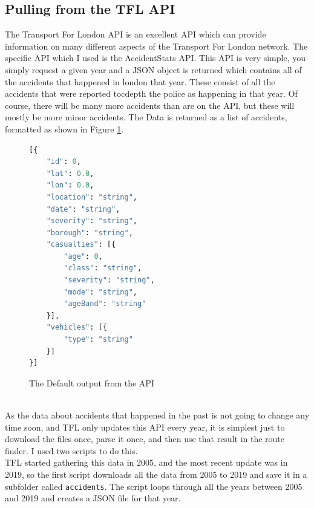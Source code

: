 \documentclass[11pt,twoside,a4paper]{report}
\begin{document}
\subsection{Pulling from the TFL API}
\label{Pulling from the TFL API}
The Transport For London API is an excellent API which can provide information on many different aspects of the Transport For London network. The specific API which I used is the AccidentStats API.
This API is very simple, you simply request a given year and a JSON object is returned which contains all of the accidents that happened in london that year. These consist of all the accidents that were reported tocdepth
the police as happening in that year. Of course, there will be many more accidents than are on the API, but these will mostly be more minor accidents.
The Data is returned as a list of accidents, formatted as shown in Figure \ref{Default}.
\begin{figure}[t]
\begin{lstlisting}[language=Python]
[{
    "id": 0,
    "lat": 0.0,
    "lon": 0.0,
    "location": "string",
    "date": "string",
    "severity": "string",
    "borough": "string",
    "casualties": [{
        "age": 0,
        "class": "string",
        "severity": "string",
        "mode": "string",
        "ageBand": "string"
    }],
    "vehicles": [{
        "type": "string"
    }]
}]
    \end{lstlisting}
\caption{The Default output from the API \cite{tflapi}}
\label{Default}
\end{figure}
\\
As the data about accidents that happened in the past is not going to change any time soon, and TFL only updates this API every year, it is simplest just to download the files once, parse it once, and then 
use that result in the route finder. I used two scripts to do this.\\
TFL started gathering this data in 2005, and the most recent update was in 2019, so the first script downloads all the data from 2005 to 2019 and save it in a subfolder called \texttt{accidents}.
The script loops through all the years between 2005 and 2019 and creates a JSON file for that year. \\
\end{document}
